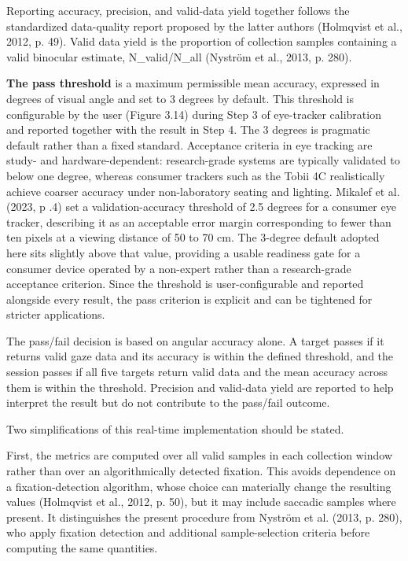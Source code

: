 \documentclass[
]{article}
\begin{document}
Reporting accuracy, precision, and valid-data yield together follows the standardized data-quality report proposed by the latter authors (Holmqvist et al., 2012, p. 49). Valid data yield is the proportion of collection samples containing a valid binocular estimate, N\_valid/N\_all (Nyström et al., 2013, p. 280).

\textbf{The pass threshold} is a maximum permissible mean accuracy, expressed in degrees of visual angle and set to 3 degrees by default. This threshold is configurable by the user (Figure 3.14) during Step 3 of eye-tracker calibration and reported together with the result in Step 4. The 3 degrees is pragmatic default rather than a fixed standard. Acceptance criteria in eye tracking are study- and hardware-dependent: research-grade systems are typically validated to below one degree, whereas consumer trackers such as the Tobii 4C realistically achieve coarser accuracy under non-laboratory seating and lighting. Mikalef et al. (2023, p .4) set a validation-accuracy threshold of 2.5 degrees for a consumer eye tracker, describing it as an acceptable error margin corresponding to fewer than ten pixels at a viewing distance of 50 to 70 cm. The 3-degree default adopted here sits slightly above that value, providing a usable readiness gate for a consumer device operated by a non-expert rather than a research-grade acceptance criterion. Since the threshold is user-configurable and reported alongside every result, the pass criterion is explicit and can be tightened for stricter applications.

The pass/fail decision is based on angular accuracy alone. A target passes if it returns valid gaze data and its accuracy is within the defined threshold, and the session passes if all five targets return valid data and the mean accuracy across them is within the threshold. Precision and valid-data yield are reported to help interpret the result but do not contribute to the pass/fail outcome.

Two simplifications of this real-time implementation should be stated.

First, the metrics are computed over all valid samples in each collection window rather than over an algorithmically detected fixation. This avoids dependence on a fixation-detection algorithm, whose choice can materially change the resulting values (Holmqvist et al., 2012, p. 50), but it may include saccadic samples where present. It distinguishes the present procedure from Nyström et al. (2013, p. 280), who apply fixation detection and additional sample-selection criteria before computing the same quantities.
\end{document}
